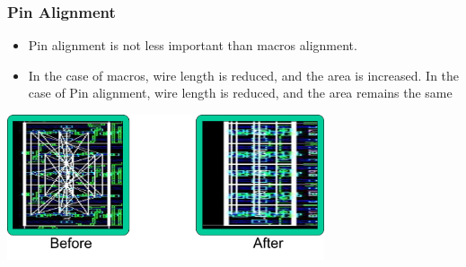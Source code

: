 \documentclass[compress]{beamer}
\begin{document}
\begin{frame}
	\frametitle{Pin Alignment}
		\begin{itemize}
			\item Pin alignment is not less important than macros alignment. 
			\item In the case of macros, wire length is reduced, and the area is increased. In the case of Pin alignment, wire length is reduced, and the area remains the same
		\end{itemize}
		\begin{center}
			\includegraphics[width=0.7\textwidth]{pin}
		\end{center}
\end{frame}
\end{document}
